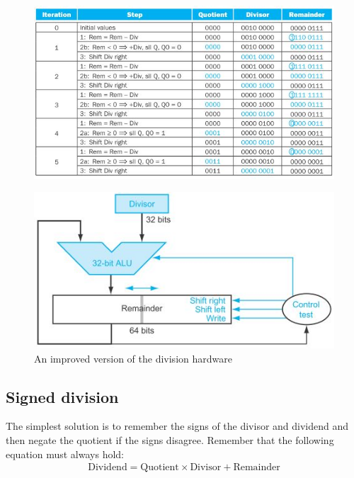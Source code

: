 \documentclass[10pt,a4paper]{article}
\begin{document}
\begin{figure} [h!]
    \centering
    \includegraphics[scale=0.8]{Divide example.JPG}
\end{figure}

\begin{figure} [h!]
    \centering
    \includegraphics[scale=0.7]{Refined divide.JPG}
    \caption{An improved version of the division hardware}
\end{figure}

\subsection{Signed division}

The simplest solution is to remember the signs of the divisor and dividend and then negate the
quotient if the signs disagree. Remember that the following equation must always hold:
\begin{align*}
    \text{Dividend} = \text{Quotient} \times \text{Divisor} + \text{Remainder}
\end{align*}
\end{document}
